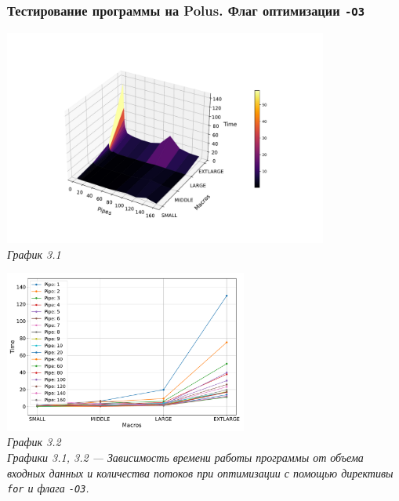 \documentclass[a4paper, 11pt]{article}
\begin{document}
\subsubsection*{Тестирование программы на Polus. Флаг оптимизации \texttt{-O3}}
\begin{center}
    \includegraphics[width=0.8\textwidth]{../graph/for_o3.pdf} \\
    \small \it
    График 3.1
\end{center}

\begin{center}
    \includegraphics[width=0.6\textwidth]{../graph/for_o31.pdf} \\
    \small \it
    График 3.2\\ Графики 3.1, 3.2 --- Зависимость времени работы программы от объема входных данных и количества потоков при оптимизации с помощью директивы \texttt{for} и флага \texttt{-O3}.
\end{center}
\end{document}
